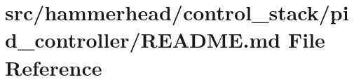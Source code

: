 \hypertarget{control__stack_2pid__controller_2README_8md}{}\section{src/hammerhead/control\+\_\+stack/pid\+\_\+controller/\+R\+E\+A\+D\+ME.md File Reference}
\label{control__stack_2pid__controller_2README_8md}
